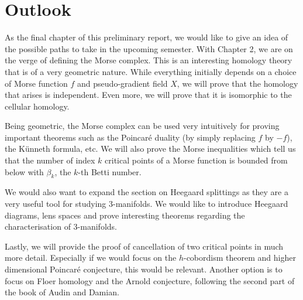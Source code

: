 \chapter*{Outlook}

As the final chapter of this preliminary report, we would like to give an idea of the possible paths to take in the upcoming semester.
With Chapter 2, we are on the verge of defining the Morse complex.
This is an interesting homology theory that is of a very geometric nature.
While everything initially depends on a choice of Morse function $f$ and pseudo-gradient field $X$, we will prove that the homology that arises is independent.
Even more, we will prove that it is isomorphic to the cellular homology.

Being geometric, the Morse complex can be used very intuitively for proving important theorems such as the Poincaré duality (by simply replacing $f$ by $-f$), the K\"unneth formula, etc.
We will also prove the Morse inequalities which tell us that the number of index $k$ critical points of a Morse function is bounded from below with $\beta_k$, the  $k$-th Betti number.

We would also want to expand the section on Heegaard splittings as they are a very useful tool for studying $3$-manifolds. We would like to introduce Heegaard diagrams, lens spaces and prove interesting theorems regarding the characterisation of $3$-manifolds.

Lastly, we will provide the proof of cancellation of two critical points in much more detail. Especially if we would focus on the $h$-cobordism theorem and higher dimensional Poincaré conjecture, this would be relevant.
Another option is to focus on Floer homology and the Arnold conjecture, following the second part of the book of Audin and Damian.
